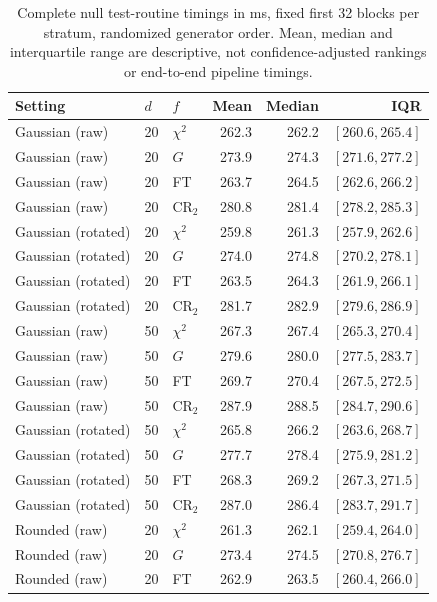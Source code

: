 \begin{table}[t]
\caption{Complete null test-routine timings in ms, fixed first 32 blocks per stratum, randomized generator order. Mean, median and interquartile range are descriptive, not confidence-adjusted rankings or end-to-end pipeline timings.}
\label{tab:matched-f-runtime-null}
\centering\small
\setlength{\tabcolsep}{8pt}\renewcommand{\arraystretch}{1.2}
\begin{tabular}{lllrrr}
\toprule
Setting & $d$ & $f$ & Mean & Median & IQR \\
\midrule
Gaussian (raw) & 20 & $\chi^2$ & 262.3 & 262.2 & $[260.6, 265.4]$ \\
Gaussian (raw) & 20 & $G$ & 273.9 & 274.3 & $[271.6, 277.2]$ \\
Gaussian (raw) & 20 & FT & 263.7 & 264.5 & $[262.6, 266.2]$ \\
Gaussian (raw) & 20 & CR$_2$ & 280.8 & 281.4 & $[278.2, 285.3]$ \\
Gaussian (rotated) & 20 & $\chi^2$ & 259.8 & 261.3 & $[257.9, 262.6]$ \\
Gaussian (rotated) & 20 & $G$ & 274.0 & 274.8 & $[270.2, 278.1]$ \\
Gaussian (rotated) & 20 & FT & 263.5 & 264.3 & $[261.9, 266.1]$ \\
Gaussian (rotated) & 20 & CR$_2$ & 281.7 & 282.9 & $[279.6, 286.9]$ \\
Gaussian (raw) & 50 & $\chi^2$ & 267.3 & 267.4 & $[265.3, 270.4]$ \\
Gaussian (raw) & 50 & $G$ & 279.6 & 280.0 & $[277.5, 283.7]$ \\
Gaussian (raw) & 50 & FT & 269.7 & 270.4 & $[267.5, 272.5]$ \\
Gaussian (raw) & 50 & CR$_2$ & 287.9 & 288.5 & $[284.7, 290.6]$ \\
Gaussian (rotated) & 50 & $\chi^2$ & 265.8 & 266.2 & $[263.6, 268.7]$ \\
Gaussian (rotated) & 50 & $G$ & 277.7 & 278.4 & $[275.9, 281.2]$ \\
Gaussian (rotated) & 50 & FT & 268.3 & 269.2 & $[267.3, 271.5]$ \\
Gaussian (rotated) & 50 & CR$_2$ & 287.0 & 286.4 & $[283.7, 291.7]$ \\
Rounded (raw) & 20 & $\chi^2$ & 261.3 & 262.1 & $[259.4, 264.0]$ \\
Rounded (raw) & 20 & $G$ & 273.4 & 274.5 & $[270.8, 276.7]$ \\
Rounded (raw) & 20 & FT & 262.9 & 263.5 & $[260.4, 266.0]$ \\

\end{tabular}
\end{table}
